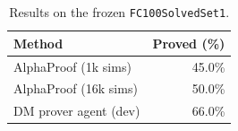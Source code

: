 \begin{table}
  \vspace{-15pt}
  \caption{Results on the frozen \texttt{FC100SolvedSet1}.}
  \vspace{5pt}
  \label{tab:results_bench_table}
  \centering
  \small
  \begin{tabular}{lr}
    \toprule
    Method & Proved (\%) \\
    \midrule
    AlphaProof (1k sims)  & 45.0\% \\
    AlphaProof (16k sims) & 50.0\% \\
    DM prover agent (dev)       & 66.0\% \\
    \bottomrule
  \end{tabular}
  \vspace{-10pt}
\end{table}